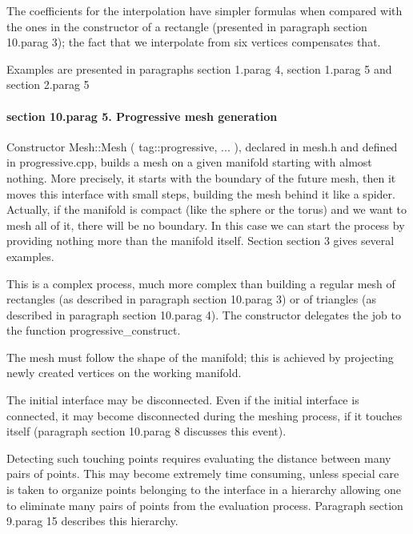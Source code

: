 {The coefficients for the interpolation have simpler formulas when compared with the ones in the
constructor of a rectangle (presented in paragraph \numb section 10.\numb parag 3);
the fact that we interpolate from six vertices compensates that.

Examples are presented in paragraphs \numb section 1.\numb parag 4, \numb section 1.\numb parag 5
and \numb section 2.\numb parag 5
\vfil\eject

\paragraph{\numb section 10.\numb parag 5. Progressive mesh generation}

Constructor {\codett Mesh::Mesh ( tag::progressive, ... )}, declared in {\codett mesh.h} and defined
in {\codett progressive.cpp}, builds a mesh on a given manifold starting with almost nothing.
More precisely, it starts with the boundary of the future mesh, then it
moves this interface with small steps, building the mesh behind it like a spider.
Actually, if the manifold is compact (like the sphere or the torus) and we want to mesh all of it,
there will be no boundary.
In this case we can start the process by providing nothing more than the manifold itself.
Section \numb section 3 gives several examples.

This is a complex process, much more complex than building a regular mesh of rectangles
(as described in paragraph \numb section 10.\numb parag 3) or of triangles (as described
in paragraph \numb section 10.\numb parag 4).
The constructor delegates the job to the function {\codett progressive\_construct}.

The mesh must follow the shape of the manifold; this is achieved by {\codett project}ing
newly created vertices on the working manifold.

The initial interface may be disconnected.
Even if the initial interface is connected, it may become disconnected during the meshing
process, if it touches itself (paragraph \numb section 10.\numb parag 8 discusses this event).

Detecting such touching points requires evaluating the distance between many pairs of points.
This may become extremely time consuming, unless special care is taken to organize points
belonging to the interface in a hierarchy allowing one to eliminate many pairs of points
from the evaluation process.
Paragraph \numb section 9.\numb parag 15 describes this hierarchy.

}
